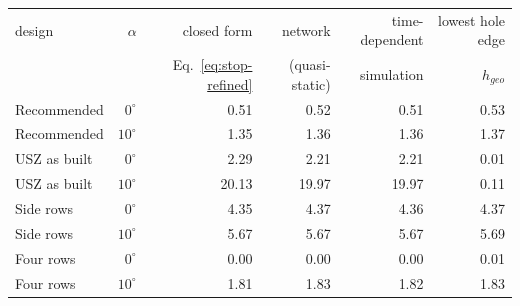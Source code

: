 \begin{tabular}{@{}l r r r r r@{}}
\toprule
design & $\alpha$ & closed form & network & time-dependent & lowest hole edge \\
 & & Eq.~\eqref{eq:stop-refined} & (quasi-static) & simulation & $h_{geo}$ \\
\midrule
Recommended & $0^\circ$ & 0.51 & 0.52 & 0.51 & 0.53 \\
Recommended & $10^\circ$ & 1.35 & 1.36 & 1.36 & 1.37 \\
USZ as built & $0^\circ$ & 2.29 & 2.21 & 2.21 & 0.01 \\
USZ as built & $10^\circ$ & 20.13 & 19.97 & 19.97 & 0.11 \\
Side rows & $0^\circ$ & 4.35 & 4.37 & 4.36 & 4.37 \\
Side rows & $10^\circ$ & 5.67 & 5.67 & 5.67 & 5.69 \\
Four rows & $0^\circ$ & 0.00 & 0.00 & 0.00 & 0.01 \\
Four rows & $10^\circ$ & 1.81 & 1.83 & 1.82 & 1.83 \\
\bottomrule
\end{tabular}
